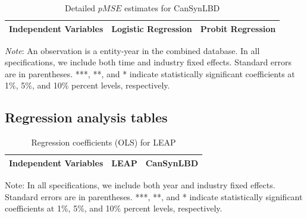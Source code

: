 
\begin{table}[H]
  \centering
 \setlength{\tabcolsep}{11pt}
\begin{threeparttable}
 \caption{Detailed $pMSE$ estimates for CanSynLBD} \label{tab:pMSE_regression_can} \medskip
\renewcommand{\arraystretch}{1}
\begin{tabular}{l|c c| c c}
\toprule
\textbf{Independent Variables}&\multicolumn{2}{c|}{\textbf{Logistic Regression}} &  \multicolumn{2}{c}{\textbf{Probit Regression}}\\
\midrule

  \bottomrule
  \end{tabular} 
\begin{tablenotes}
\small
\item \textit{Note}: An observation is a entity-year in the combined database. In all specifications, we include both time and industry fixed effects. Standard errors are in parentheses.  ***, **, and * indicate statistically significant coefficients at 1\%, 5\%, and 10\% percent levels, respectively.
 \end{tablenotes}
 \end{threeparttable}
\end{table}


\subsection{Regression analysis tables}
\label{sec:regression_tables}

\begin{table}[H]
  \centering
\begin{threeparttable}
 \caption{Regression coefficients (OLS) for LEAP} \label{tab:OLS_can} \medskip
\renewcommand{\arraystretch}{1}
\begin{tabular}{l|c c| c c}
\toprule
\textbf{Independent Variables}&\multicolumn{2}{c|}{\textbf{LEAP}} &  \multicolumn{2}{c}{\textbf{CanSynLBD}}\\
\midrule

   \bottomrule
  \end{tabular} 
\begin{tablenotes}
\small
\item Note: In all specifications, we include both year and industry fixed effects. Standard errors are in parentheses.  ***, **, and * indicate statistically significant coefficients at 1\%, 5\%, and 10\% percent levels, respectively.
 \end{tablenotes}
 \end{threeparttable}
\end{table}

